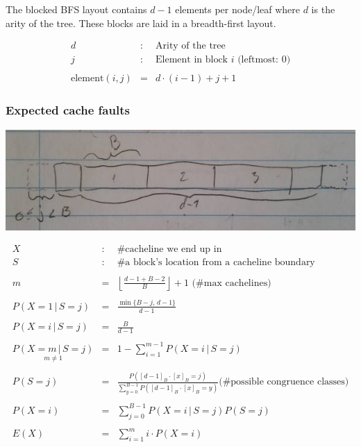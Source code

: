 The blocked BFS layout contains $d - 1$ elements per node/leaf where $d$ is the arity of the tree. These blocks are laid in a breadth-first layout.

\begin{eqnarray*}
d & : & \textrm{Arity of the tree} \\
j & : & \textrm{Element in block $i$ (leftmost: $0$)} \\
\\
\mathrm{element}(i, j) & = & d\cdot (i - 1) + j + 1
\end{eqnarray*}

\subsubsection*{Expected cache faults}



\includegraphics[width=1\textwidth]{blocks}

\begin{eqnarray*}
X & : & \textrm{\#cacheline we end up in}\\
S & : & \textrm{\#a block's location from a cacheline boundary}\\
\\
m & = & \left\lfloor \frac{d-1+B-2}{B}\right\rfloor +1\textrm{ (\#max cachelines)}\\
\\
P(X=1\,|\, S=j) & = & \frac{\min\{B-j,\, d-1\}}{d-1}\\
\\
P(X=i\,|\, S=j) & = & \frac{B}{d-1}\\
\\
\underset{m\neq1}{P(X=m\,|\, S=j)} & = & 1-\sum_{i=1}^{m-1}P(X=i\,|\, S=j)\\
\\ %
P(S=j) & = & \frac{P([d-1]_{B}\cdot[x]_{B}=j)}{\sum_{y=0}^{B-1}P([d-1]_{B}\cdot[x]_{B}=y)}\textrm{(\#possible congruence classes)}\\
\\
P(X=i) & = & \sum_{j=0}^{B-1}P(X=i\,|\, S=j)P(S=j)\\
\\
E(X) & = & \sum_{i=1}^{m}i\cdot P(X=i)
\end{eqnarray*}

